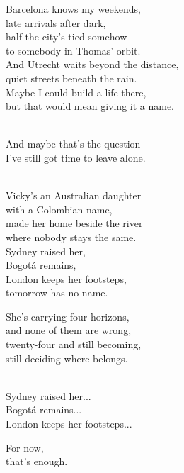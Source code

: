 \begin{lyrics}
Barcelona knows my weekends,\\
late arrivals after dark,\\
half the city's tied somehow\\
to somebody in Thomas' orbit.\\
And Utrecht waits beyond the distance,\\
quiet streets beneath the rain.\\
Maybe I could build a life there,\\
but that would mean giving it a name.

\\
And maybe that's the question\\
I've still got time to leave alone.

\\
Vicky's an Australian daughter\\
with a Colombian name,\\
made her home beside the river\\
where nobody stays the same.\\
Sydney raised her,\\
Bogotá remains,\\
London keeps her footsteps,\\
tomorrow has no name.

She's carrying four horizons,\\
and none of them are wrong,\\
twenty-four and still becoming,\\
still deciding where belongs.

\\
Sydney raised her...\\
Bogotá remains...\\
London keeps her footsteps...

For now,\\
that's enough.
\end{lyrics}

